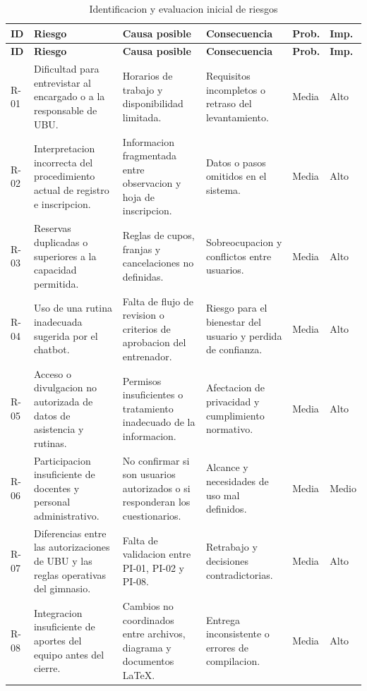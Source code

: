 \begingroup
\footnotesize
\renewcommand{\arraystretch}{1.16}
\begin{longtable}{|p{0.85cm}|p{4.1cm}|p{3.7cm}|p{3.35cm}|p{1.0cm}|p{1.0cm}|}
\caption{Identificacion y evaluacion inicial de riesgos}\label{tab:identificacion-riesgos}\\\hline
\textbf{ID} & \textbf{Riesgo} & \textbf{Causa posible} & \textbf{Consecuencia} & \textbf{Prob.} & \textbf{Imp.} \\ \hline
\endfirsthead
\hline \textbf{ID} & \textbf{Riesgo} & \textbf{Causa posible} & \textbf{Consecuencia} & \textbf{Prob.} & \textbf{Imp.} \\ \hline
\endhead
R-01 & Dificultad para entrevistar al encargado o a la responsable de UBU. & Horarios de trabajo y disponibilidad limitada. & Requisitos incompletos o retraso del levantamiento. & Media & Alto \\ \hline
R-02 & Interpretacion incorrecta del procedimiento actual de registro e inscripcion. & Informacion fragmentada entre observacion y hoja de inscripcion. & Datos o pasos omitidos en el sistema. & Media & Alto \\ \hline
R-03 & Reservas duplicadas o superiores a la capacidad permitida. & Reglas de cupos, franjas y cancelaciones no definidas. & Sobreocupacion y conflictos entre usuarios. & Media & Alto \\ \hline
R-04 & Uso de una rutina inadecuada sugerida por el chatbot. & Falta de flujo de revision o criterios de aprobacion del entrenador. & Riesgo para el bienestar del usuario y perdida de confianza. & Media & Alto \\ \hline
R-05 & Acceso o divulgacion no autorizada de datos de asistencia y rutinas. & Permisos insuficientes o tratamiento inadecuado de la informacion. & Afectacion de privacidad y cumplimiento normativo. & Media & Alto \\ \hline
R-06 & Participacion insuficiente de docentes y personal administrativo. & No confirmar si son usuarios autorizados o si responderan los cuestionarios. & Alcance y necesidades de uso mal definidos. & Media & Medio \\ \hline
R-07 & Diferencias entre las autorizaciones de UBU y las reglas operativas del gimnasio. & Falta de validacion entre PI-01, PI-02 y PI-08. & Retrabajo y decisiones contradictorias. & Media & Alto \\ \hline
R-08 & Integracion insuficiente de aportes del equipo antes del cierre. & Cambios no coordinados entre archivos, diagrama y documentos LaTeX. & Entrega inconsistente o errores de compilacion. & Media & Alto \\ \hline
\end{longtable}
\endgroup

